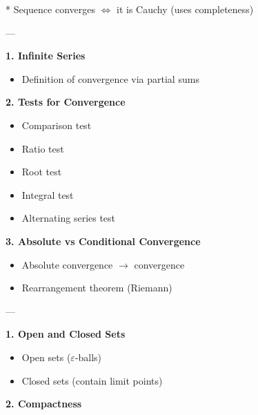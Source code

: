 \documentclass[12pt,a4paper]{report}
\begin{document}
\begin{description}
\begin{description}
  * Sequence converges $\iff$ it is Cauchy (uses completeness)

	\end{description}
---

\item {}

	\begin{description}
    \item \textbf{1. Infinite Series}

		\begin{itemize}
        \item Definition of convergence via partial sums
		\end{itemize}

    \item \textbf{2. Tests for Convergence}

		\begin{itemize}
        \item Comparison test
        \item Ratio test
        \item Root test
        \item Integral test
        \item Alternating series test
		\end{itemize}

    \item \textbf{3. Absolute vs Conditional Convergence}

		\begin{itemize}
        \item Absolute convergence $\to$ convergence
        \item Rearrangement theorem (Riemann)
		\end{itemize}

	\end{description}
---

\item {}

	\begin{description}
    \item \textbf{1. Open and Closed Sets}

		\begin{itemize}
        \item Open sets ($\varepsilon$-balls)
        \item Closed sets (contain limit points)
		\end{itemize}

    \item \textbf{2. Compactness}


\end{description}
\end{description}
\end{document}
